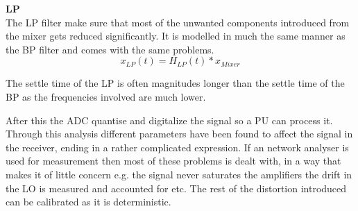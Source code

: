 
\textbf{\Gls{LP}}\\
The LP filter make sure that most of the unwanted components introduced from the mixer gets reduced significantly. It is modelled in much the same manner as the BP filter and comes with the same problems. 
\begin{equation}
x_{LP}(t) = H_{LP}(t)*x_{Mixer}
\end{equation}
\begin{where}
\end{where}

The settle time of the LP is often magnitudes longer than the settle time of the BP as the frequencies involved are much lower. 

After this the \gls{ADC} quantise and digitalize the signal so a \gls{PU} can process it. Through this analysis different parameters have been found to affect the signal in the receiver, ending in a rather complicated expression. If an network analyser is used for measurement then most of these problems is dealt with, in a way that makes it of little concern e.g. the signal never saturates the amplifiers the drift in the LO is measured and accounted for etc. The rest of the distortion introduced can be calibrated as it is deterministic. 


